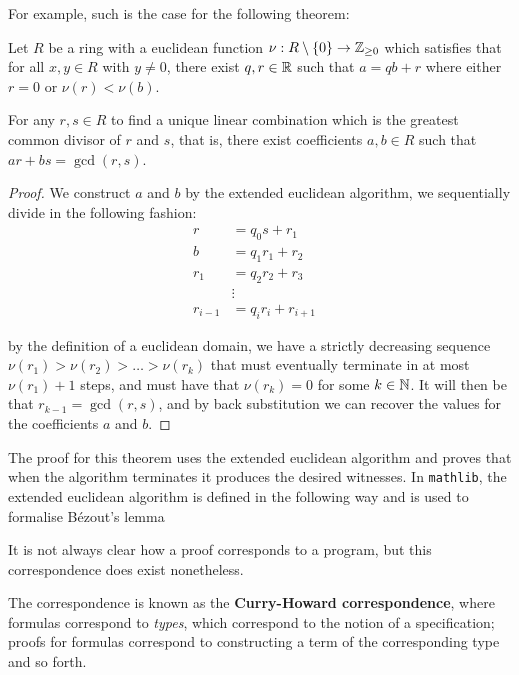 For example, such is the case for the following theorem:

\begin{example}
    Let $R$ be a ring with a euclidean function $\nu : R \setminus \{0\} \rightarrow \mathbb{Z}_{\geq 0}$ which satisfies that for all $x, y \in R$ with $y \ne 0$, there exist $q, r \in \mathbb{R}$ such that $a  = qb + r$ where either $r = 0$ or $\nu(r) < \nu(b)$.

    For any $r,s \in R$ to find a unique linear combination which is the greatest common divisor of $r$ and $s$, that is, there exist coefficients $a, b \in R$ such that $ar + bs = \gcd(r, s)$.
\end{example}
\begin{proof}
    We construct $a$ and $b$ by the extended euclidean algorithm, we sequentially divide in the following fashion:
      \begin{align}
          r &= q_0 s + r_1\\
          b &= q_1 r_1 + r_2\\
          r_1 &= q_2 r_2 + r_3\\
          &\vdots\\
          r_{i-1} &= q_i r_i + r_{i + 1}&
      \end{align}
  
      by the definition of a euclidean domain, we have a strictly decreasing sequence $\nu(r_1) > \nu(r_2) > \ldots > \nu(r_k)$ that must eventually terminate in at most $\nu(r_1) + 1$ steps,
      and must have that $\nu(r_k) = 0$ for some $k \in \mathbb{N}$. It will then be that $r_{k -1} = \gcd(r, s)$, and by back substitution we can recover the values for the coefficients $a$ and $b$.
  \end{proof}

The proof for this theorem uses the extended euclidean algorithm and proves that when the algorithm terminates it produces the desired witnesses.
In \texttt{mathlib}, the extended euclidean algorithm is defined in the following way and is used to formalise Bézout's lemma


It is not always clear how a proof corresponds to a program, but this correspondence does exist nonetheless.

The correspondence is known as the \textbf{Curry-Howard correspondence}, where formulas correspond to \textit{types}, which correspond to the notion of a specification;
proofs for formulas correspond to constructing a term of the corresponding type and so forth. 

